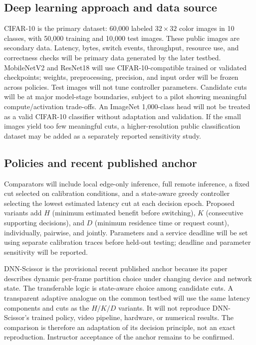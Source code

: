 \documentclass[10pt,a4paper,twocolumn]{article}
\begin{document}
\subsection{Deep learning approach and data source}
CIFAR-10 is the primary dataset: 60,000 labeled $32\times32$ color images in 10 classes, with 50,000 training and 10,000 test images. These public images are secondary data. Latency, bytes, switch events, throughput, resource use, and correctness checks will be primary data generated by the later testbed. MobileNetV2 and ResNet18 will use CIFAR-10-compatible trained or validated checkpoints; weights, preprocessing, precision, and input order will be frozen across policies. Test images will not tune controller parameters. Candidate cuts will be at major model-stage boundaries, subject to a pilot showing meaningful compute/activation trade-offs. An ImageNet 1,000-class head will not be treated as a valid CIFAR-10 classifier without adaptation and validation. If the small images yield too few meaningful cuts, a higher-resolution public classification dataset may be added as a separately reported sensitivity study.

\subsection{Policies and recent published anchor}
Comparators will include local edge-only inference, full remote inference, a fixed cut selected on calibration conditions, and a state-aware greedy controller selecting the lowest estimated latency cut at each decision epoch. Proposed variants add $H$ (minimum estimated benefit before switching), $K$ (consecutive supporting decisions), and $D$ (minimum residence time or request count), individually, pairwise, and jointly. Parameters and a service deadline will be set using separate calibration traces before held-out testing; deadline and parameter sensitivity will be reported.

DNN-Scissor \cite{scissor} is the provisional recent published anchor because its paper describes dynamic per-frame partition choice under changing device and network state. The transferable logic is state-aware choice among candidate cuts. A transparent adaptive analogue on the common testbed will use the same latency components and cuts as the $H/K/D$ variants. It will not reproduce DNN-Scissor's trained policy, video pipeline, hardware, or numerical results. The comparison is therefore an adaptation of its decision principle, not an exact reproduction. Instructor acceptance of the anchor remains to be confirmed.
\end{document}
